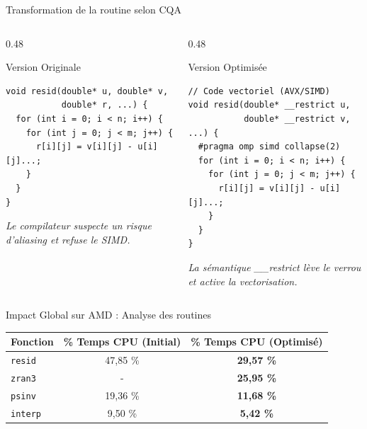 \begin{frame}[fragile]{Transformation de la routine selon CQA}
    \fontsize{6}{7}\selectfont
    \begin{columns}[T]
        \begin{column}{0.48\textwidth}
            \begin{alertblock}{Version Originale}
\begin{verbatim}
void resid(double* u, double* v, 
           double* r, ...) {
  for (int i = 0; i < n; i++) {
    for (int j = 0; j < m; j++) {
      r[i][j] = v[i][j] - u[i][j]...;
    }
  }
}
\end{verbatim}
            \end{alertblock}
            \centering \textit{Le compilateur suspecte un risque d'aliasing et refuse le SIMD.}
        \end{column}
        
        \begin{column}{0.48\textwidth}
            \begin{exampleblock}{Version Optimisée}
\begin{verbatim}
// Code vectoriel (AVX/SIMD)
void resid(double* __restrict u, 
           double* __restrict v, ...) {
  #pragma omp simd collapse(2)
  for (int i = 0; i < n; i++) {
    for (int j = 0; j < m; j++) {
      r[i][j] = v[i][j] - u[i][j]...;
    }
  }
}
\end{verbatim}
            \end{exampleblock}
            \centering \textit{La sémantique \_\_restrict lève le verrou et active la vectorisation.}
        \end{column}
    \end{columns}
\end{frame}

\begin{frame}{Impact Global sur AMD : Analyse des routines}
    
    \begin{table}
        \fontsize{6}{7}\selectfont
        \centering
        \begin{tabular}{|l|c|c|}
            \hline
            \textbf{Fonction} & \textbf{\% Temps CPU (Initial)} & \textbf{\% Temps CPU (Optimisé)} \\ \hline
            \texttt{resid}    & 47,85 \%            & \textbf{29,57 \%}    \\ \hline
            \texttt{zran3}    & -                               & \textbf{25,95 \%}    \\ \hline
            \texttt{psinv}    & 19,36 \%            & \textbf{11,68 \%}    \\ \hline
            \texttt{interp}   & 9,50 \%             & \textbf{5,42 \%}     \\ \hline
        \end{tabular}
    \end{table}
\end{frame}

